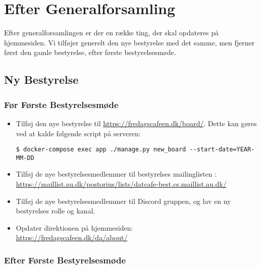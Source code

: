 \section{Efter Generalforsamling}
\label{sec:efter-generalforsamling}

Efter generalforsamlingen er der en række ting, der skal opdateres på hjemmesiden.
Vi tilføjer generelt den nye bestyrelse med det samme, men fjerner først den gamle bestyrelse, 
efter første bestyrelsesmøde.

\subsection{Ny Bestyrelse}
\label{sec:ny-bestyrelse}

\subsubsection{Før Første Bestyrelsesmøde}
\label{sec:foer-foerste-bestyrelsesmoede}

\begin{itemize}
    \item Tilføj den nye bestyrelse til \url{https://fredagscafeen.dk/board/}. 
    Dette kan gøres ved at kalde følgende script på serveren:
    {\small\begin{verbatim}
$ docker-compose exec app ./manage.py new_board --start-date=YEAR-MM-DD\end{verbatim}}
    \item Tilføj de nye bestyrelsesmedlemmer til bestyrelses mailinglisten :\\
    {\small\url{https://maillist.au.dk/postorius/lists/datcafe-best.cs.maillist.au.dk/}}
    \item Tilføj de nye bestyrelsesmedlemmer til Discord gruppen, og lav en ny bestyrelses rolle og kanal.
    \item Opdater direktionen på hjemmesiden:\\
    {\small\url{https://fredagscafeen.dk/da/about/}}
\end{itemize}

\subsubsection{Efter Første Bestyrelsesmøde}
\label{sec:efter-foerste-bestyrelsesmoede}

